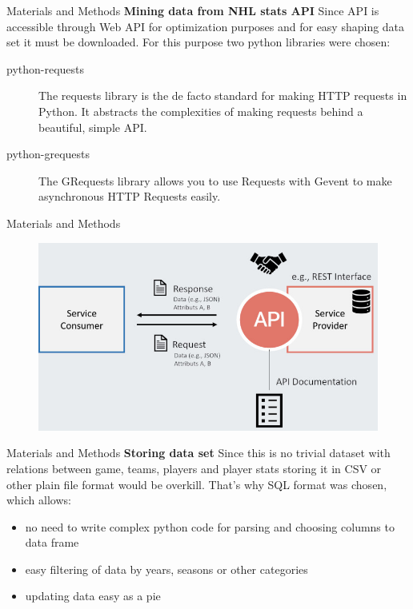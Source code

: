 \begin{frame}{Materials and Methods}
    \textbf{Mining data from NHL stats API}
    \vspace{2em}
    Since API is accessible through Web API for optimization purposes and for easy shaping data set it must be downloaded. For this purpose two python libraries were chosen:
    
    \begin{description}
        \item[python-requests] The requests library is the de facto standard for making HTTP requests in Python. It abstracts the complexities of making requests behind a beautiful, simple API.
        
        \item[python-grequests] The GRequests library allows you to use Requests with Gevent to make asynchronous HTTP Requests easily.
    \end{description}
\end{frame}    
    
\begin{frame}{Materials and Methods}
    \begin{figure}[H]
        \includegraphics[width=\textwidth]{greg}
    \end{figure}
\end{frame}

\begin{frame}{Materials and Methods}
    \textbf{Storing data set}
    \vspace{2em}
    Since this is no trivial dataset with relations between game, teams, players and player stats storing it in CSV or other plain file format would be overkill. That's why SQL format was chosen, which allows:
    
    \begin{itemize}
        \item no need to write complex python code for parsing and choosing columns to data frame
        \item easy filtering of data by years, seasons or other categories
        \item updating data easy as a pie
    \end{itemize}
\end{frame}

